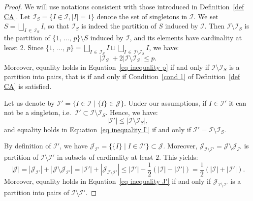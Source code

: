 \documentclass[10pt]{amsart}
\theoremstyle{definition}\newtheorem{defi}[theo]{Definition}\newtheorem{rema}[theo]{Remark}\newtheorem{exam}[theo]{Example}\newtheorem{exem}[theo]{Example}\newtheorem{nota}[theo]{Notation}
\newcommand{\I}{\mathcal{I}}
\newcommand{\J}{\mathcal{J}}
\newcommand{\norm}[1]{\left\lvert #1 \right\rvert}
\renewcommand{\leq}{\leqslant}
\begin{document}
\begin{proof}
We will use notations consistent with those introduced in Definition~\ref{def CA}. Let $\I_S=\{I \in \I, |I| =1 \}$ denote the set of singletons in $\I$. We set $S= \bigsqcup_{I \,\in\,\I_S} I$, so that $\I_S$ is indeed the partition of $S$ induced by $\I$. Then $\I \setminus \I_S$ is the partition of $\{1,\,\dots,\,p\} \setminus S$ induced by $\I$, and its elements have cardinality at least $2$. Since $\{1,\,\dots,\,p\} = \bigsqcup_{I\,\in\,\I_S} I \sqcup \bigsqcup_{I\,\in\,\I \setminus \I_S} I$, we have:
\begin{equation}\label{eq inequality p}
\norm{\I_S} + 2\norm{\I \setminus \I_S} \leq p.
\end{equation}
Moreover, equality holds in Equation~\eqref{eq inequality p} if and only if $\I \setminus \I_S$ is a partition into pairs, that is if and only if Condition~\eqref{cond 1} of Definition~\ref{def CA} is satisfied.

Let us denote by $\I' = \{I \in \I \mid \{I\} \in \J\}$. Under our assumptions, if $I \in \I'$ it can not be a singleton, i.e.~$\I' \subset \I \setminus \I_S$. Hence, we have:
\begin{equation}\label{eq inequality I'}
\norm{\I'} \leq \norm{\I \setminus \I_S},
\end{equation}
and equality holds in Equation~\eqref{eq inequality I'} if and only if $\I' = \I \setminus \I_S$.

By definition of $\I'$, we have $\J_{\I'} = \{\{I\} \mid I \in \I'\} \subset \J$. Moreover, $\J_{\I \setminus \I'} = \J \setminus \J_{\I'}$ is partition of $\I \setminus \I'$ in subsets of cardinality at least $2$. This yields:
\begin{equation}\label{eq inequality J'}
\norm{\J} = \norm{\J_{\I'}} + \norm{\J \setminus \J_{\I'}} = \norm{\I'} + \norm{\J_{\I \setminus \I'} }\leq \norm{\I'} + \frac{1}{2}\left(\norm{\I}-\norm{\I'}\right) = \frac{1}{2}\left(\norm{\I}+\norm{\I'}\right).
\end{equation}
Moreover, equality holds in Equation~\eqref{eq inequality J'} if and only if $\J_{\I \setminus \I'}$ is a partition into pairs of $\I \setminus \I'$.


\end{proof}
\end{document}
